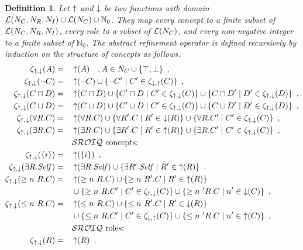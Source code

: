 \documentclass[
]{ceurart}
\newtheorem{definition}{Definition}
\begin{document}
\begin{definition}
  Let $\mathop{\uparrow}$ and $\mathop{\downarrow}$ be two functions with domain $\mathcal{L}(N_C, N_R, N_I) \cup \mathcal{L}(N_C) \cup \mathbb{N}_0$. They map every concept to a finite subset of $\mathcal{L}(N_C, N_R, N_I)$, every role to a subset of $\mathcal{L}(N_C)$, and every non-negative integer to a finite subset of $\mathbb{N}_0$.
  The \emph{abstract refinement operator} is defined recursively by induction on the structure of concepts as follows.
  \begin{alignat*}{2}
    \zeta_{\refine,\corefine}(A) &= &&\refine(A) \quad, A \in N_C \cup \{\top, \bot\} \enspace, \\
    \zeta_{\refine,\corefine}(\lnot C) &= &&\refine(\lnot C) \cup \{ \lnot C' \mid C' \in \zeta_{\corefine,\refine}(C) \} \enspace, \\
    \zeta_{\refine,\corefine}(C \sqcap D) &= &&\refine(C \sqcap D) \cup \{ C' \sqcap D \mid C' \in \zeta_{\refine,\corefine}(C) \}
    \cup \{ C \sqcap D' \mid D' \in \zeta_{\refine,\corefine}(D) \} \enspace, \\
    \zeta_{\refine,\corefine}(C \sqcup D) &= &&\refine(C \sqcup D) \cup \{ C' \sqcup D \mid C' \in \zeta_{\refine,\corefine}(C) \}
    \cup \{ C \sqcup D' \mid D' \in \zeta_{\refine,\corefine}(D) \} \enspace, \\
    \zeta_{\refine,\corefine}(\forall R.C) &= &&\refine(\forall R.C) \cup \{ \forall R'.C \mid R' \in \corefine(R) \}
    \cup \{ \forall R.C' \mid C' \in \zeta_{\refine,\corefine}(C) \} \enspace, \\
    \zeta_{\refine,\corefine}(\exists R.C) &= &&\refine(\exists R.C) \cup \{ \exists R'.C \mid R' \in \refine(R) \}
    \cup \{ \exists R.C' \mid C' \in \zeta_{\refine,\corefine}(C) \} \enspace, \\
    &&& \text{\SROIQ concepts:} \\
    \zeta_{\refine,\corefine}(\nominal i) &= &&\refine(\nominal i) \enspace, \\
    \zeta_{\refine,\corefine}(\exists R.\self) &= &&\refine(\exists R.\self) \cup \{ \exists R'.\self \mid R' \in \refine(R) \} \enspace, \\
    \zeta_{\refine,\corefine}(\more n R.C) &= &&\refine(\more n R.C) \cup \{ \more n R'.C \mid R' \in \refine(R) \} \\
    &&& \cup \{ \more n R.C' \mid C' \in \zeta_{\refine,\corefine}(C) \}
    \cup \{ \more n' R.C \mid n' \in \corefine(C) \} \enspace, \\
    \zeta_{\refine,\corefine}(\less n R.C) &= &&\refine(\less n R.C) \cup \{ \less n R'.C \mid R' \in \corefine(R) \} \\
    &&& \cup \{ \less n R.C' \mid C' \in \zeta_{\corefine,\refine}(C) \}
    \cup \{ \less n' R.C \mid n' \in \refine(C) \} \enspace, \\
    &&& \text{\SROIQ roles:} \\
    \zeta_{\refine,\corefine}(R) &= &&\refine(R) \enspace.
  \end{alignat*}


\end{definition}
\end{document}
